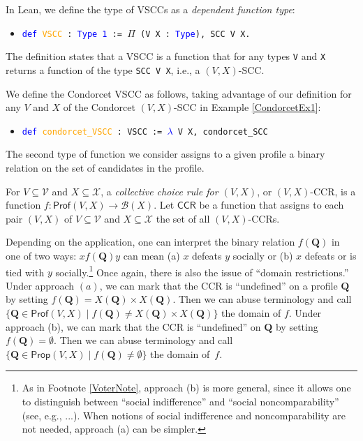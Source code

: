 \documentclass[runningheads]{llncs}
\begin{document}


In Lean, we define the type of VSCCs as a \textit{dependent function type}:
\begin{itemize}
\item[] \texttt{\textcolor{blue}{def} \textcolor{orange}{VSCC} : \textcolor{blue}{Type 1} := $\Pi$ (V X : \textcolor{blue}{Type}), SCC V X.}
\end{itemize}
The definition states that a VSCC is a function that for any types \texttt{V} and \texttt{X} returns a function of the type \texttt{SCC V X}, i.e., a $(V,X)$-SCC.

\begin{example} We define the Condorcet VSCC as follows, taking advantage of our definition for any $V$ and $X$ of the Condorcet $(V,X)$-SCC in Example \ref{CondorcetEx1}:
\begin{itemize}
\item[] \texttt{\textcolor{blue}{def} \textcolor{orange}{condorcet\_VSCC} : VSCC := \textcolor{blue}{$\lambda$} V X, condorcet\_SCC}
\end{itemize}
\end{example}

The second type of function we consider assigns to a given profile a binary relation on the set of candidates in the profile. %

\begin{definition}\textnormal{For $V\subseteq\mathcal{V}$ and $X\subseteq\mathcal{X}$, a \textit{collective choice rule for $(V,X)$}, or $(V,X)$-CCR, is a function  $f: \mathsf{Prof}(V,X)\to \mathcal{B}(X)$. Let $\mathsf{CCR}$ be a function that assigns to each pair $(V,X)$ of $V\subseteq\mathcal{V}$ and $X\subseteq\mathcal{X}$ the set of all $(V,X)$-CCRs.}\end{definition}

\noindent Depending on the application, one can interpret the binary relation $f(\mathbf{Q})$ in one of two ways: $xf(\mathbf{Q})y$ can mean (a) $x$ defeats $y$ socially or (b) $x$ defeats or is tied with $y$ socially.\footnote{As in Footnote \ref{VoterNote}, approach (b) is more general, since it allows one to distinguish between ``social indifference'' and ``social noncomparability'' (see, e.g., ...). When notions of social indifference and noncomparability are not needed, approach (a) can be simpler.} Once again, there is also the issue of ``domain restrictions.'' Under approach $(a)$, we can mark that the CCR is ``undefined'' on a profile $\mathbf{Q}$ by setting $f(\mathbf{Q})= X(\mathbf{Q})\times X(\mathbf{Q})$. Then we can abuse terminology and call $\{\mathbf{Q}\in\mathsf{Prof}(V,X)\mid f(\mathbf{Q})\neq X(\mathbf{Q})\times X(\mathbf{Q}) \}$ the domain of $f$. Under approach (b), we can mark that the CCR is ``undefined'' on $\mathbf{Q}$ by setting $f(\mathbf{Q})=\emptyset$. Then we can abuse terminology and call $\{\mathbf{Q}\in\mathsf{Prop}(V,X)\mid f(\mathbf{Q})\neq \emptyset\}$ the domain of~$f$. 
\end{document}
